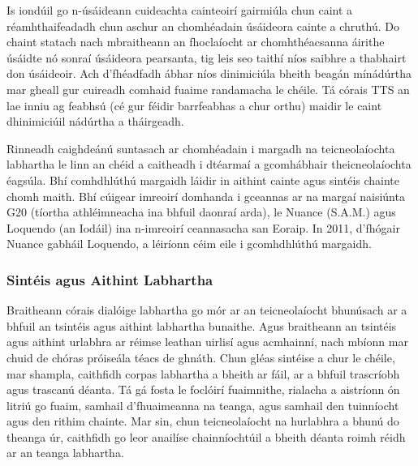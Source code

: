 \begin{multicols}{2}
Is iondúil go n-úsáideann cuideachta cainteoirí gairmiúla chun caint a réamhthaifeadadh chun aschur an chomhéadain úsáideora cainte a chruthú. Do chaint statach nach mbraitheann an fhoclaíocht ar chomhthéacsanna áirithe úsáidte nó sonraí úsáideora pearsanta, tig leis seo taithí níos saibhre a thabhairt don úsáideoir. Ach d’fhéadfadh ábhar níos dinimiciúla bheith beagán mínádúrtha mar gheall gur cuireadh comhaid fuaime randamacha le chéile. Tá córais TTS an lae inniu ag feabhsú (cé gur féidir barrfeabhas a chur orthu) maidir le caint dhinimiciúil nádúrtha a tháirgeadh. 

Rinneadh caighdeánú suntasach ar chomhéadain i margadh na teicneolaíochta labhartha le linn an chéid a caitheadh i dtéarmaí a gcomhábhair theicneolaíochta éagsúla. Bhí comhdhlúthú margaidh láidir in aithint cainte agus sintéis chainte chomh maith. Bhí cúigear imreoirí domhanda i gceannas ar na margaí naisiúnta G20 (tíortha athléimneacha ina bhfuil daonraí arda), le Nuance (S.A.M.) agus Loquendo (an Iodáil) ina n-imreoirí ceannasacha san Eoraip.  In 2011, d’fhógair Nuance gabháil Loquendo, a léiríonn céim eile i gcomhdhlúthú margaidh.

\subsubsection*{Sintéis agus Aithint Labhartha}
Braitheann córais dialóige labhartha go mór ar an teicneolaíocht bhunúsach ar a bhfuil an tsintéis agus aithint labhartha bunaithe. Agus braitheann an tsintéis agus aithint urlabhra ar réimse leathan uirlisí agus acmhainní, nach mbíonn mar chuid de chóras próiseála téacs de ghnáth. Chun gléas sintéise a chur le chéile, mar shampla, caithfidh corpas labhartha a bheith ar fáil, ar a bhfuil trascríobh agus trascanú déanta. Tá gá fosta le foclóirí fuaimnithe, rialacha a aistríonn ón litriú go fuaim, samhail d’fhuaimeanna na teanga, agus samhail den tuinníocht agus den rithim chainte. Mar sin, chun teicneolaíocht na hurlabhra a bhunú do theanga úr, caithfidh go leor anailíse chainníochtúil a bheith déanta roimh réidh ar an teanga labhartha.


\end{multicols}
